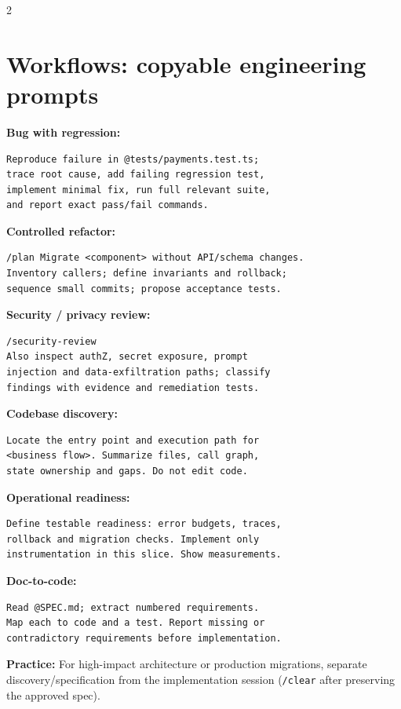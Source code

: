 \documentclass[9pt,a4paper]{extarticle}
\newcommand{\kw}[1]{\textbf{\color{navy}#1}}
\newcommand{\cmd}[1]{{\footnotesize\color{navy}\texttt{#1}}}
\newcommand{\tip}[1]{\par\textbf{\color{teal}Practice:} #1\par}
\begin{document}
\begin{multicols}{2}
\section{Workflows: copyable engineering prompts}
\kw{Bug with regression:}
\begin{lstlisting}
Reproduce failure in @tests/payments.test.ts;
trace root cause, add failing regression test,
implement minimal fix, run full relevant suite,
and report exact pass/fail commands.
\end{lstlisting}
\kw{Controlled refactor:}
\begin{lstlisting}
/plan Migrate <component> without API/schema changes.
Inventory callers; define invariants and rollback;
sequence small commits; propose acceptance tests.
\end{lstlisting}
\kw{Security / privacy review:}
\begin{lstlisting}
/security-review
Also inspect authZ, secret exposure, prompt
injection and data-exfiltration paths; classify
findings with evidence and remediation tests.
\end{lstlisting}
\kw{Codebase discovery:}
\begin{lstlisting}
Locate the entry point and execution path for
<business flow>. Summarize files, call graph,
state ownership and gaps. Do not edit code.
\end{lstlisting}
\kw{Operational readiness:}
\begin{lstlisting}
Define testable readiness: error budgets, traces,
rollback and migration checks. Implement only
instrumentation in this slice. Show measurements.
\end{lstlisting}
\kw{Doc-to-code:}
\begin{lstlisting}
Read @SPEC.md; extract numbered requirements.
Map each to code and a test. Report missing or
contradictory requirements before implementation.
\end{lstlisting}
\tip{For high-impact architecture or production migrations, separate discovery/specification from the implementation session (\cmd{/clear} after preserving the approved spec).}


\end{multicols}
\end{document}
